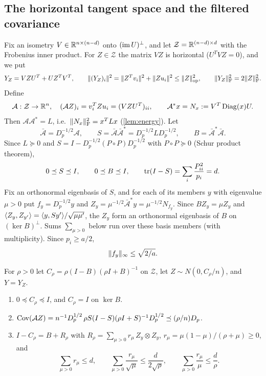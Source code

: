 \subsection{The horizontal tangent space and the filtered covariance}

Fix an isometry $V\in\mathbb R^{n\times(n-d)}$ onto $(\operatorname{im} U)^\perp$, and let
$\mathcal Z=\mathbb R^{(n-d)\times d}$ with the Frobenius inner product. For
$Z\in\mathcal Z$ the matrix $VZ$ is horizontal ($U^TVZ=0$), and we put
\[
 Y_Z=VZU^T+UZ^TV^T,\qquad \lVert (Y_Z)_i\rVert^2=\lVert Z^Tv_i\rVert^2+\lVert Zu_i\rVert^2\le\lVert Z\rVert_{\mathrm{op}}^2,
 \qquad \lVert Y_Z\rVert_{\mathrm F}^2=2\lVert Z\rVert_{\mathrm F}^2 .
\]
Define
\[
 \mathcal A:\mathcal Z\to\mathbb R^n,\quad (\mathcal AZ)_i=v_i^TZu_i=(VZU^T)_{ii},\qquad
 \mathcal A^*x=N_x:=V^T\operatorname{Diag}(x)U .
\]
Then $\mathcal A\mathcal A^*=L$, i.e.\ $\lVert N_x\rVert_{\mathrm F}^2=x^TLx$ (\cref{lem:energy}). Let
\[
 \bar{\mathcal A}=D_p^{-1/2}\mathcal A,\qquad
 S=\bar{\mathcal A}\bar{\mathcal A}^*=D_p^{-1/2}LD_p^{-1/2},\qquad
 B=\bar{\mathcal A}^*\bar{\mathcal A} .
\]
Since $L\succeq0$ and $S=I-D_p^{-1/2}(P\circ P)D_p^{-1/2}$ with $P\circ P\succeq0$
(Schur product theorem),
\begin{equation}\label{eq:S}
 0\preceq S\preceq I,\qquad 0\preceq B\preceq I,\qquad
 \operatorname{tr}(I-S)=\sum_i\frac{P_{ii}^2}{p_i}=d .
\end{equation}
Fix an orthonormal eigenbasis of $S$, and for each of its members $y$ with
eigenvalue $\mu>0$ put $f_y=D_p^{-1/2}y$ and
$Z_y=\mu^{-1/2}\bar{\mathcal A}^*y=\mu^{-1/2}N_{f_y}$. Since $BZ_y=\mu Z_y$ and
$\langle Z_y,Z_{y'}\rangle=\langle y,Sy'\rangle/\sqrt{\mu\mu'}$, the $Z_y$ form an orthonormal
eigenbasis of $B$ on $(\ker B)^\perp$. Sums $\sum_{\mu>0}$ below run over these
basis members (with multiplicity). Since $p_i\ge a/2$,
\begin{equation}\label{eq:finfty}
 \lVert f_y\rVert_\infty\le\sqrt{2/a}.
\end{equation}

\begin{definition}
For $\rho>0$ let $C_\rho=\rho(I-B)(\rho I+B)^{-1}$ on $\mathcal Z$, let
$Z\sim N(0,C_\rho/n)$, and $Y=Y_Z$.
\end{definition}

\begin{lemma}\label{lem:filter}
\begin{enumerate}[label=(\alph*)]
\item $0\preceq C_\rho\preceq I$, and $C_\rho=I$ on $\ker B$.
\item $\operatorname{Cov}(\mathcal AZ)=n^{-1}D_p^{1/2}\,\rho S(I-S)(\rho I+S)^{-1}D_p^{1/2}\preceq
(\rho/n)D_p$.
\item $I-C_\rho=B+R_\rho$ with $R_\rho=\sum_{\mu>0}r_\mu\,Z_y\otimes Z_y$,
$r_\mu=\mu(1-\mu)/(\rho+\mu)\ge0$, and
\[
 \sum_{\mu>0}r_\mu\le d,\qquad \sum_{\mu>0}\frac{r_\mu}{\sqrt\mu}\le\frac d{2\sqrt\rho},
 \qquad\sum_{\mu>0}\frac{r_\mu}\mu\le\frac d\rho .
\]
\end{enumerate}
\end{lemma}

